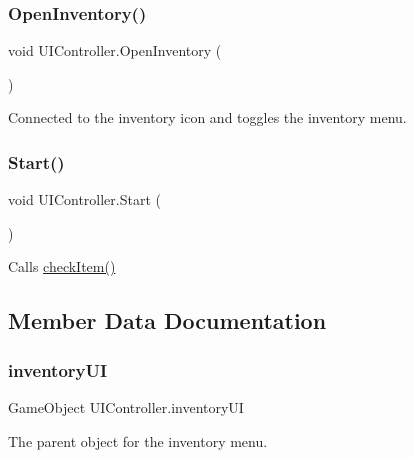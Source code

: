 \subsubsection{\texorpdfstring{OpenInventory()}{OpenInventory()}}
{\footnotesize\ttfamily void U\+I\+Controller.\+Open\+Inventory (\begin{DoxyParamCaption}{ }\end{DoxyParamCaption})}



Connected to the inventory icon and toggles the inventory menu. 

\mbox{\label{class_u_i_controller_a676b3b972c33885db4565ee43f23e459}} 
\subsubsection{\texorpdfstring{Start()}{Start()}}
{\footnotesize\ttfamily void U\+I\+Controller.\+Start (\begin{DoxyParamCaption}{ }\end{DoxyParamCaption})\hspace{0.3cm}{\ttfamily [private]}}



Calls \mbox{\hyperlink{class_u_i_controller_a9ea46066b8e67d6f3c65a69e94ad3b53}{check\+Item()}} 



\subsection{Member Data Documentation}
\mbox{\label{class_u_i_controller_a4c46a34bd06dccf8d8824da40c677fdb}} 
\subsubsection{\texorpdfstring{inventoryUI}{inventoryUI}}
{\footnotesize\ttfamily Game\+Object U\+I\+Controller.\+inventory\+UI}



The parent object for the inventory menu. 

\mbox{\label{class_u_i_controller_a5cd04315c42b8c0acf858e49c7d955be}} 
